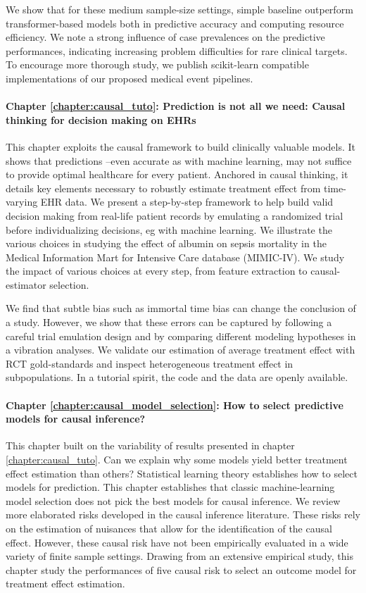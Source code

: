 \documentclass[french,12pt,twoside,a4paper]{book}
\begin{document}
We show that for these medium sample-size settings, simple baseline outperform
transformer-based models both in predictive accuracy and computing resource
efficiency. We note a strong influence of case prevalences on the predictive
performances, indicating increasing problem difficulties for rare clinical
targets. To encourage more thorough study, we publish scikit-learn compatible
implementations of our proposed medical event pipelines.

\paragraph{Chapter \ref{chapter:causal_tuto}: Prediction is not all we need:
  Causal thinking for decision making on EHRs} This chapter exploits the causal
framework to build clinically valuable models. It shows that predictions
--even accurate as with machine learning, may not suffice to provide optimal
healthcare for every patient. Anchored in causal thinking, it details key
elements necessary to robustly estimate treatment effect from time-varying EHR
data. We present a step-by-step framework to help build valid decision making
from real-life patient records by emulating a randomized trial before
individualizing decisions, eg with machine learning. We illustrate the various
choices in studying the effect of albumin on sepsis mortality in the Medical
Information Mart for Intensive Care database (MIMIC-IV). We study the impact
of various choices at every step, from feature extraction to causal-estimator
selection.

We find that subtle bias such as immortal time bias can change the conclusion
of a study. However, we show that these errors can be captured by following a
careful trial emulation design and by comparing different modeling hypotheses
in a vibration analyses. We validate our estimation of average treatment
effect with RCT gold-standards and inspect heterogeneous treatment effect in
subpopulations. In a tutorial spirit, the code and the data are openly available.

\paragraph{Chapter \ref{chapter:causal_model_selection}: How to select
  predictive models for causal inference?} This chapter built on the variability
of results presented in chapter \ref{chapter:causal_tuto}. Can we explain why
some models yield better treatment effect estimation than others? Statistical
learning theory establishes how to select models for prediction. This chapter
establishes that classic machine-learning model selection does not pick the
best models for causal inference. We review more elaborated risks developed in
the causal inference literature. These risks rely on the estimation of
nuisances that allow for the identification of the causal effect. However,
these causal risk have not been empirically evaluated in a wide variety of
finite sample settings. Drawing from an extensive empirical study, this
chapter study the performances of five causal risk to select an outcome model
for treatment effect estimation.
\end{document}
